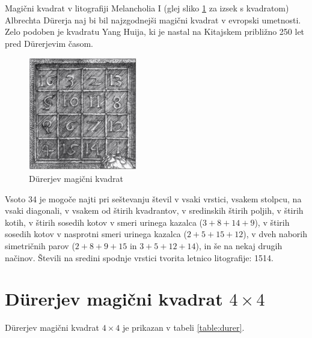 \documentclass[a4paper,12pt]{article}
\begin{document}
Magični kvadrat v litografiji Melancholia I (glej sliko \ref{fig:durer} 
za izsek s kvadratom) Albrechta Dürerja naj bi bil najzgodnejši magični kvadrat
v evropski umetnosti. Zelo podoben je kvadratu Yang Huija, ki je nastal na Kitajskem
približno 250 let pred Dürerjevim časom. %

\begin{figure}[h]
   \centering
   \includegraphics[scale=1.3]{durer.png}  %
   \caption{Dürerjev magični kvadrat}  %
   \label{fig:durer}  %
   \end{figure}



Vsoto 34 je mogoče najti pri seštevanju števil v vsaki vrstici, vsakem stolpcu,
na vsaki diagonali, v vsakem od štirih kvadrantov, v sredinskih štirih poljih,
v štirih kotih, v štirih sosedih kotov v smeri urinega kazalca ($3+8+14+9$), v
štirih sosedih kotov v nasprotni smeri urinega kazalca ($2+5+15+12$), v dveh naborih
simetričnih parov ($2+8+9+15$ in $3+5+12+14$), in še na nekaj drugih načinov.
Števili na sredini spodnje vrstici tvorita letnico litografije: 1514.
%

\section{Dürerjev magični kvadrat $4 \times 4$}

Dürerjev magični kvadrat $4 \times 4$ je prikazan v tabeli \ref{table:durer}.
\end{document}
